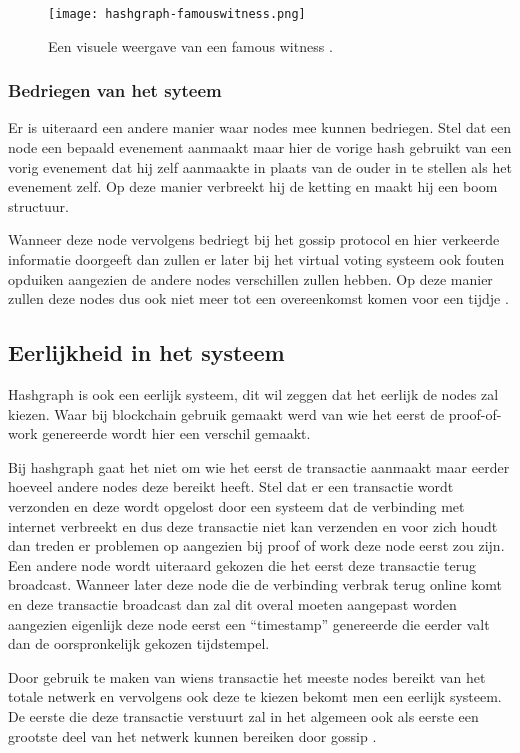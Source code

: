 \begin{figure}
	\texttt{[image: hashgraph-famouswitness.png]}
	\caption{Een visuele weergave van een famous witness \textcite{Baird2016}.}
	\label{fig:hashgraph-famouswitness}
\end{figure}


\subsubsection{Bedriegen van het syteem}
Er is uiteraard een andere manier waar nodes mee kunnen bedriegen. Stel dat een node een bepaald evenement aanmaakt maar hier de vorige hash gebruikt van een vorig evenement dat hij zelf aanmaakte in plaats van de ouder in te stellen als het evenement zelf. Op deze manier verbreekt hij de ketting en maakt hij een boom structuur. 

Wanneer deze node vervolgens bedriegt bij het gossip protocol en hier verkeerde informatie doorgeeft dan zullen er later bij het virtual voting systeem ook fouten opduiken aangezien de andere nodes verschillen zullen hebben. Op deze manier zullen deze nodes dus ook niet meer tot een overeenkomst komen voor een tijdje \textcite{Baird2016a}.

\subsection{Eerlijkheid in het systeem}
Hashgraph is ook een eerlijk systeem, dit wil zeggen dat het eerlijk de nodes zal kiezen. 
Waar bij blockchain gebruik gemaakt werd van wie het eerst de proof-of-work genereerde wordt hier een verschil gemaakt. 

Bij hashgraph gaat het niet om wie het eerst de transactie aanmaakt maar eerder hoeveel andere nodes deze bereikt heeft. Stel dat er een transactie wordt verzonden en deze wordt opgelost door een systeem dat de verbinding met internet verbreekt en dus deze transactie niet kan verzenden en voor zich houdt dan treden er problemen op aangezien bij proof of work deze node eerst zou zijn. Een andere node wordt uiteraard gekozen die het eerst deze transactie terug broadcast. Wanneer later deze node die de verbinding verbrak terug online komt en deze transactie broadcast dan zal dit overal moeten aangepast worden aangezien eigenlijk deze node eerst een ``timestamp'' genereerde die eerder valt dan de oorspronkelijk gekozen tijdstempel. 

Door gebruik te maken van wiens transactie het meeste nodes bereikt van het totale netwerk en vervolgens ook deze te kiezen bekomt men een eerlijk systeem. De eerste die deze transactie verstuurt zal in het algemeen ook als eerste een grootste deel van het netwerk kunnen bereiken door gossip \textcite{Baird2016a}.

